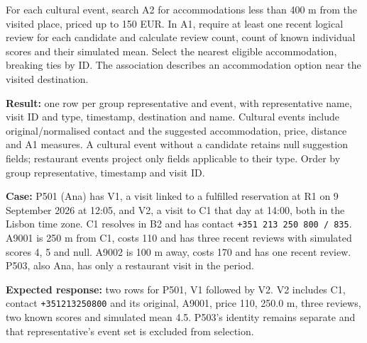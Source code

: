 For each cultural event, search A2 for accommodations less than 400 m from the visited place, priced up to 150 EUR. In A1, require at least one recent logical review for each candidate and calculate review count, count of known individual scores and their simulated mean. Select the nearest eligible accommodation, breaking ties by ID. The association describes an accommodation option near the visited destination.

\textbf{Result:} one row per group representative and event, with representative name, visit ID and type, timestamp, destination and name. Cultural events include original/normalised contact and the suggested accommodation, price, distance and A1 measures. A cultural event without a candidate retains null suggestion fields; restaurant events project only fields applicable to their type. Order by group representative, timestamp and visit ID.

\textbf{Case:} P501 (Ana) has V1, a visit linked to a fulfilled reservation at R1 on 9 September 2026 at 12:05, and V2, a visit to C1 that day at 14:00, both in the Lisbon time zone. C1 resolves in B2 and has contact \texttt{+351 213 250 800 / 835}. A9001 is 250 m from C1, costs 110 and has three recent reviews with simulated scores 4, 5 and null. A9002 is 100 m away, costs 170 and has one recent review. P503, also Ana, has only a restaurant visit in the period.\par
\textbf{Expected response:} two rows for P501, V1 followed by V2. V2 includes C1, contact \texttt{+351213250800} and its original, A9001, price 110, 250.0 m, three reviews, two known scores and simulated mean 4.5. P503's identity remains separate and that representative's event set is excluded from selection.
